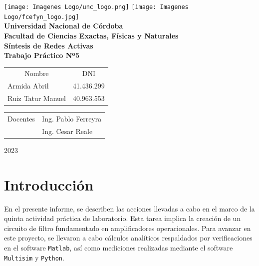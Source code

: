 \documentclass[12pt,A4paper,titlepage]{article}
\begin{document}
\begin{titlepage}

\thispagestyle{empty}


\begin{center}
    \texttt{[image: Imagenes Logo/unc\_logo.png]}
    \texttt{[image: Imagenes Logo/fcefyn\_logo.jpg]}
    \\[1cm]
    \vspace{5pt}
    \LARGE \textbf{Universidad Nacional de Córdoba}\\[0.5cm] 
    \large \textbf{Facultad de Ciencias Exactas, Físicas y Naturales} \\[0.5cm] 
    \large \textbf{Síntesis de Redes Activas}
    \\[0.5cm]
    \large \textbf{Trabajo Práctico Nº5}\\[0.5cm]
    \vspace{60pt}
    \begin{table}[!h]
    \centering
    \begin{tabular}{ll}
    \multicolumn{1}{c}{Nombre} & \multicolumn{1}{c}{DNI} \\
    Armida Abril & 41.436.299  \\
    Ruiz Tatur Manuel & 40.963.553
    \end{tabular}
    \end{table}
    \vspace{20pt}
    \begin{table}[!h]
    \centering
    \begin{tabular}{ll}
    \multicolumn{1}{c}{Docentes} & Ing. Pablo Ferreyra \\
     & Ing. Cesar Reale \\
     
    \end{tabular}
    \end{table}
    \vspace{20pt}
    \large 2023
\end{center}

\end{titlepage}

\newpage
\tableofcontents %

\newpage
\section{Introducción}
\hspace{1mm} En el presente informe, se describen las acciones llevadas a cabo en el marco de la quinta actividad práctica de laboratorio. Esta tarea implica la creación de un circuito de filtro fundamentado en amplificadores operacionales. Para avanzar en este proyecto, se llevaron a cabo cálculos analíticos respaldados por verificaciones en el software \texttt{Matlab}, así como mediciones realizadas mediante el software \texttt{Multisim} y \texttt{Python}.
\end{document}
